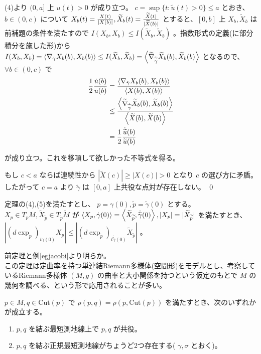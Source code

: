 \documentclass[dvipdfmx,a4paper]{jsreport}
\theoremstyle{definition}
\renewcommand{\tilde}{\widetilde}
\begin{document}
(4)より $(0,a]$ 上 $u(t)>0$ が成り立つ。 $c=\sup\{t \colon \tilde{u}(t)>0\} \leq a$ とおき、 $b \in (0,c)$ について $X_b(t)={X(t) \over |X(b)|},\tilde{X}_b(t)={\tilde{X}(t) \over |\tilde{X}(b)|}$ とすると、$[0,b]$ 上 $X_b,\tilde{X}_b$ は前補題の条件を満たすので $I(X_b,X_b) \leq I(\tilde{X}_b,\tilde{X}_b)$ 。指数形式の定義(に部分積分を施した形)から $I(X_b,X_b)=\ev{\nabla_{\dot{\gamma}}X_b(b),X_b(b)} \leq I(\tilde{X}_b,\tilde{X}_b)=\ev{\tilde{\nabla}_{\dot{\tilde{\gamma}}}\tilde{X}_b(b),\tilde{X}_b(b)}$ となるので、$\forall b \in (0,c)$ で
\begin{align*}
    {1 \over 2}{\dot{u}(b)\over u(b)} &= {\ev{\nabla_{\dot{\gamma}}X_b(b),X_b(b)} \over \ev{X(b),X(b)}} \\
    &\leq {\ev{\tilde{\nabla}_{\dot{\tilde{\gamma}}}\tilde{X}_b(b),\tilde{X}_b(b)} \over \ev{\tilde{X}(b),\tilde{X}(b)}} \\
    &= {1 \over 2}{\dot{\tilde{u}}(b)\over \tilde{u}(b)}
\end{align*}

が成り立つ。これを移項して欲しかった不等式を得る。

もし $c<a$ ならば連続性から $|\tilde{X}(c)| \geq |X(c)|>0$ となり $c$ の選び方に矛盾。したがって $c=a$ より $\tilde{\gamma}$ は $[0,a]$ 上共役な点対が存在しない。 \qed

\cor 定理の(4),(5)を満たすとし、 $p=\gamma(0),\tilde{p}=\tilde{\gamma}(0)$ とする。 $X_p \in T_pM,\tilde{X}_{\tilde{p}} \in T_{\tilde{p}}\tilde{M}$ が $\ev{X_p,\dot{\gamma}(0)}=\ev{\tilde{X}_{\tilde{p}},\dot{\tilde{\gamma}}(0)},|X_p|=|\tilde{X}_{\tilde{p}}|$ を満たすとき、 $|(d\exp_{p})_{t\dot{\gamma}(0)}X_p| \leq |(d\exp_{\tilde{p}})_{t\dot{\tilde{\gamma}}(0)}\tilde{X}_{\tilde{p}}|$ 。

\prf 前定理と例\ref{egjacobi}より明らか。
\\

この定理は定曲率を持つ単連結Riemann多様体(空間形)をモデルとし、考察しているRiemann多様体 $(M,g)$ の曲率と大小関係を持つという仮定のもとで $M$ の幾何を調べる、という形で応用されることが多い。

\lem $p \in M,q \in \mbox{Cut}(p)$ で $\rho(p,q)=\rho(p,\mbox{Cut}(p))$ を満たすとき、次のいずれかが成立する。
\begin{enumerate}
    \item $p,q$ を結ぶ最短測地線上で $p,q$ が共役。
    \item $p,q$ を結ぶ正規最短測地線がちょうど2つ存在する( $\gamma,\sigma$ とおく)。
\end{enumerate}
\end{document}
